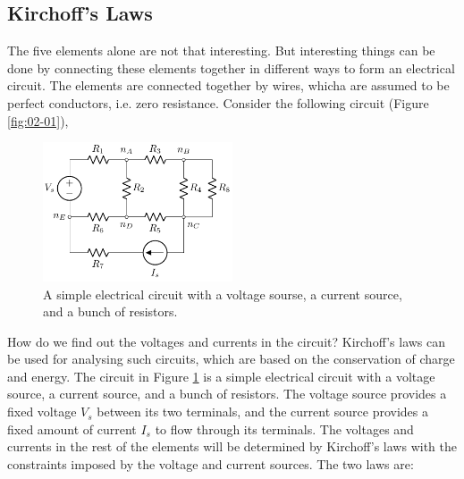 \subsection{Kirchoff's Laws}
The five elements alone are not that interesting. But interesting things can be done by connecting these elements together in different ways to form an electrical circuit. The elements are connected together by wires, whicha are assumed to be perfect conductors, i.e. zero resistance. Consider the following circuit (Figure \ref{fig:02-01}),
\begin{figure}[t]
    \centering
    \includegraphics[width=0.5\textwidth]{figure/fig02-02.pdf}
    \caption{A simple electrical circuit with a voltage sourse, a current source, and a bunch of resistors.}
    \label{fig:02-02}
\end{figure}

How do we find out the voltages and currents in the circuit? Kirchoff's laws can be used for analysing such circuits, which are based on the conservation of charge and energy. The circuit in Figure \ref{fig:02-02} is a simple electrical circuit with a voltage source, a current source, and a bunch of resistors. The voltage source provides a fixed voltage $V_s$ between its two terminals, and the current source provides a fixed amount of current $I_s$ to flow through its terminals. The voltages and currents in the rest of the elements will be determined by Kirchoff's laws with the constraints imposed by the voltage and current sources. The two laws are:

